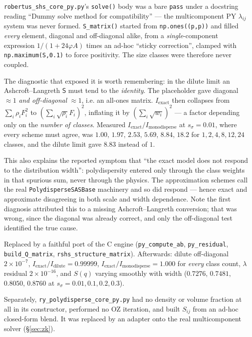 \documentclass[11pt,a4paper]{article}
\newcommand{\code}[1]{\texttt{#1}}
\begin{document}
\begin{enumerate}
\code{robertus\_shs\_core\_py.py}'s \code{solve()} body was a bare
\code{pass} under a docstring reading ``Dummy solve method for
compatibility'' --- the multicomponent PY $\lambda_{ij}$ system was never
formed. \code{S\_matrix()} started from \code{np.ones((p,p))} and filled
\emph{every} element, diagonal and off-diagonal alike, from a
\emph{single}-component expression $1/(1+24\varphi A)$ times an ad-hoc
``sticky correction'', clamped with \code{np.maximum(S,0.1)} to force
positivity. The size classes were therefore never coupled.

The diagnostic that exposed it is worth remembering: in the dilute limit an
Ashcroft--Langreth $\mathsf{S}$ must tend to the \emph{identity}. The
placeholder gave diagonal $\approx1$ \emph{and off-diagonal} $\approx1$, i.e.
an all-ones matrix. $I_{\text{exact}}$ then collapses from
$\sum_i\rho_iF_i^2$ to $(\sum_i\sqrt{\rho_i}F_i)^2$, inflating it by
$(\sum_i\sqrt{w_i})^2$ --- a factor depending only on the \emph{number of
classes}. Measured $I_{\text{exact}}/I_{\text{monodisperse}}$ at
$s_\sigma=0.01$, where every scheme must agree, was $1.00$, $1.97$, $2.53$,
$5.69$, $8.84$, $18.2$ for $1,2,4,8,12,24$ classes, and the dilute limit gave
$8.83$ instead of $1$.

This also explains the reported symptom that ``the exact model does not
respond to the distribution width'': polydispersity entered only through the
class weights in that spurious sum, never through the physics. The
approximation schemes call the real \code{PolydisperseSASBase} machinery and
so did respond --- hence exact and approximate disagreeing in both scale and
width dependence. Note the first diagnosis attributed this to a missing
Ashcroft--Langreth conversion; that was wrong, since the diagonal was already
correct, and only the off-diagonal test identified the true cause.

Replaced by a faithful port of the C engine (\code{py\_compute\_ab},
\code{py\_residual}, \code{build\_Q\_matrix},
\code{rshs\_structure\_matrix}). Afterwards: dilute off-diagonal
$2\times10^{-7}$, $I_{\text{exact}}/I_{\text{dilute}} = 0.99999$,
$I_{\text{exact}}/I_{\text{monodisperse}} = 1.000$ for \emph{every} class
count, $\lambda$ residual $2\times10^{-16}$, and $S(q)$ varying smoothly with
width ($0.7276$, $0.7481$, $0.8050$, $0.8760$ at
$s_\sigma=0.01,0.1,0.2,0.3$).

Separately, \code{ry\_polydisperse\_core\_py.py} had no density or volume
fraction at all in its constructor, performed no OZ iteration, and built
$S_{ij}$ from an ad-hoc closed-form blend. It was replaced by an adapter onto
the real multicomponent solver (\S\ref{sec:zk}).


\end{enumerate}
\end{document}
